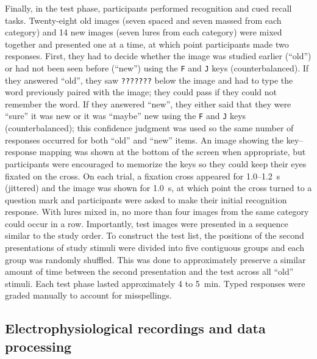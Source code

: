 Finally, in the test phase, participants performed recognition and cued recall tasks.  Twenty-eight old images (seven spaced and seven massed from each category) and 14 new images (seven lures from each category) were mixed together and presented one at a time, at which point participants made two responses.  First, they had to decide whether the image was studied earlier (``old'') or had not been seen before (``new'') using the \texttt{F} and \texttt{J} keys (counterbalanced).  If they answered ``old'', they saw \texttt{???????} below the image and had to type the word previously paired with the image; they could pass if they could not remember the word.  If they answered ``new'', they either said that they were ``sure'' it was new or it was ``maybe'' new using the \texttt{F} and \texttt{J} keys (counterbalanced); this confidence judgment was used so the same number of responses occurred for both ``old'' and ``new'' items. An image showing the key--response mapping was shown at the bottom of the screen when appropriate, but participants were encouraged to memorize the keys so they could keep their eyes fixated on the cross.  On each trial, a fixation cross appeared for 1.0--1.2~s (jittered) and the image was shown for 1.0~s, at which point the cross turned to a question mark and participants were asked to make their initial recognition response.  With lures mixed in, no more than four images from the same category could occur in a row.  Importantly, test images were presented in a sequence similar to the study order.  To construct the test list, the positions of the second presentations of study stimuli were divided into five contiguous groups and each group was randomly shuffled.  This was done to approximately preserve a similar amount of time between the second presentation and the test across all ``old'' stimuli.  Each test phase lasted approximately 4 to 5~min.  Typed responses were graded manually to account for misspellings.



\subsection{Electrophysiological recordings and data processing}

